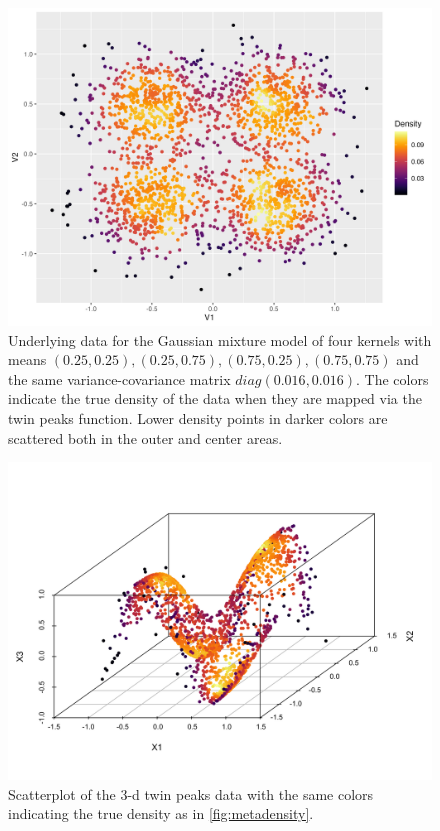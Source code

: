 \documentclass[12pt]{article}
\begin{document}
\begin{figure}

{\centering \includegraphics[width=0.8\linewidth]{figures/truedensity_twinpeaks_dc_labv} 

}

\caption{Underlying data for the Gaussian mixture model of four kernels with means $(0.25, 0.25), (0.25, 0.75), (0.75, 0.25), (0.75, 0.75)$ and the same variance-covariance matrix $diag(0.016, 0.016)$. The colors indicate the true density of the data when they are mapped via the twin peaks function. Lower density points in darker colors are scattered both in the outer and center areas.}\label{fig:metadensity}
\end{figure}



\begin{figure}

{\centering \includegraphics[width=0.75\linewidth]{figures/scatterplot3d_twinpeaks_dc} 

}

\caption{Scatterplot of the 3-d twin peaks data with the same colors indicating the true density as in \autoref{fig:metadensity}.}\label{fig:twinpeaks3d}
\end{figure}
\end{document}
